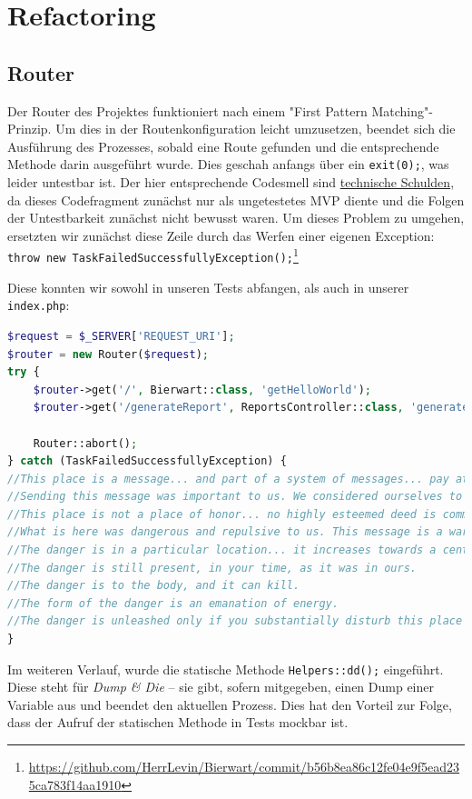 \documentclass[12pt,a4paper,titlepage,ngerman,pdftex]{report}
\begin{document}
    \section{Refactoring}\label{sec:refactoring}

    \subsection{Router}\label{subsec:router}
    Der Router des Projektes funktioniert nach einem "First Pattern Matching"-Prinzip.
    Um dies in der Routenkonfiguration leicht umzusetzen, beendet sich die Ausführung des Prozesses, sobald eine Route gefunden und die entsprechende Methode darin ausgeführt wurde.
    Dies geschah anfangs über ein \verb|exit(0);|, was leider untestbar ist.
    Der hier entsprechende Codesmell sind \href{https://refactoring.guru/refactoring/technical-debt}{technische Schulden}, da dieses Codefragment zunächst nur als ungetestetes MVP diente und die Folgen der \glqq Untestbarkeit\grqq{} zunächst nicht bewusst waren.
    Um dieses Problem zu umgehen, ersetzten wir zunächst diese Zeile durch das Werfen einer eigenen Exception: \verb|throw new TaskFailedSuccessfullyException();|\footnote{\url{https://github.com/HerrLevin/Bierwart/commit/b56b8ea86c12fe04e9f5ead235ca783f14aa1910}}

    Diese konnten wir sowohl in unseren Tests abfangen, als auch in unserer \verb|index.php|:

    \begin{lstlisting}[language=php,label={lst:lstlisting},caption={Ursprüngliche Implementation der Router-Exception}]
$request = $_SERVER['REQUEST_URI'];
$router = new Router($request);
try {
    $router->get('/', Bierwart::class, 'getHelloWorld');
    $router->get('/generateReport', ReportsController::class, 'generateReport');

    Router::abort();
} catch (TaskFailedSuccessfullyException) {
//This place is a message... and part of a system of messages... pay attention to it!
//Sending this message was important to us. We considered ourselves to be a powerful culture.
//This place is not a place of honor... no highly esteemed deed is commemorated here... nothing valued is here.
//What is here was dangerous and repulsive to us. This message is a warning about danger.
//The danger is in a particular location... it increases towards a center... the center of danger is here... of a particular size and shape, and below us.
//The danger is still present, in your time, as it was in ours.
//The danger is to the body, and it can kill.
//The form of the danger is an emanation of energy.
//The danger is unleashed only if you substantially disturb this place physically. This place is best shunned and left uninhabited.
}
    \end{lstlisting}
\noindent
    Im weiteren Verlauf, wurde die statische Methode \verb|Helpers::dd();| eingeführt.
    Diese steht für \textit{Dump \& Die} -- sie gibt, sofern mitgegeben, einen Dump einer Variable aus und beendet den aktuellen Prozess.
    Dies hat den Vorteil zur Folge, dass der Aufruf der statischen Methode in Tests mockbar ist.
\end{document}
